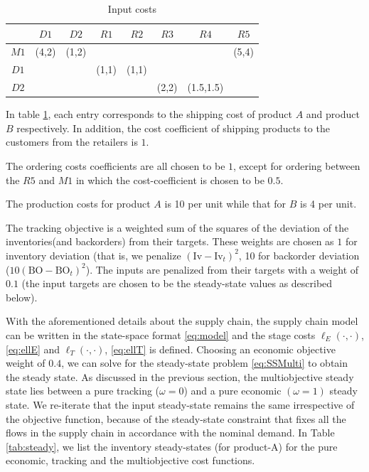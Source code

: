 \documentclass[10pt]{article}
\newcommand{\BO}{\textrm{BO}}
\newcommand{\Inv}{\textrm{Iv}}
\theoremstyle{definition}
\begin{document}
\begin{table}
\caption{Input costs}
\label{tab:input_economic}
\begin{center}
\begin{tabular}{cccccccc}\toprule
& $D1$ & $D2$  & $R1$ & $R2$ & $R3$ & $R4$ & $R5$ \\
\midrule
$M1$ &(4,2)&(1,2)& & & & &(5,4)\\
$D1$ & & &(1,1)&(1,1)& & & \\
$D2$ & & & & &(2,2)&(1.5,1.5)& \\
\bottomrule
\end{tabular}
\end{center}
\end{table}

In table \ref{tab:input_economic}, each entry corresponds to the
shipping cost of product $A$ and product $B$ respectively. In
addition, the cost coefficient of shipping products to the
customers from the retailers is $1$.

The ordering costs coefficients are all chosen to be $1$, except for
ordering between the $R5$ and $M1$ in which the cost-coefficient is
chosen to be $0.5$. 

The production costs for product $A$ is 10 per unit while that for $B$
is 4 per unit.


The tracking objective is a weighted sum of the squares of the
deviation of the inventories(and backorders) from their targets. These
weights are chosen as $1$ for inventory deviation (that is, we
penalize $(\Inv-\Inv_t)^2$, 10 for backorder deviation
($10(\BO-\BO_t)^2$). The inputs are penalized from their targets with
a weight of $0.1$ (the input targets are chosen to be the steady-state
values as described below).


With the aforementioned details about the supply chain, the supply
chain model can be written in the state-space format \eqref{eq:model} and the stage
costs $\ell_E(\cdot,\cdot)$, \eqref{eq:ellE} and
$\ell_T(\cdot,\cdot)$, \eqref{eq:ellT} is defined.  Choosing an
economic objective weight of $0.4$, we can solve for the steady-state
problem \eqref{eq:SSMulti} to obtain the steady state. As discussed in
the previous section, the multiobjective steady state lies between a
pure tracking ($\omega = 0$) and a pure economic $(\omega=1)$ steady
state. We re-iterate that the input steady-state remains the same
irrespective of the objective function, because of the steady-state
constraint that fixes all the flows in the supply chain in accordance
with the nominal demand. In Table \ref{tab:steady}, we list the
inventory steady-states (for product-A) for the pure economic, tracking and the
multiobjective cost functions.
\end{document}
